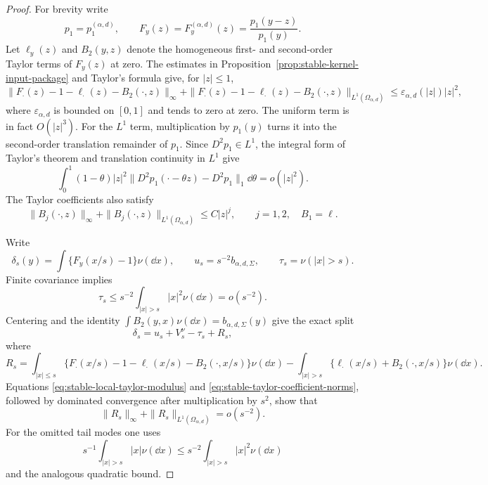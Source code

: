 \begin{proof}
For brevity write
\[
 p_1=p_1^{(\alpha,d)},\qquad
 F_y(z)=F_y^{(\alpha,d)}(z)
 =\frac{p_1(y-z)}{p_1(y)}.
\]
Let \(\ell_y(z)\) and \(B_2(y,z)\) denote the homogeneous first- and
second-order Taylor terms of \(F_y(z)\) at zero.  The estimates in
Proposition~\ref{prop:stable-kernel-input-package} and Taylor's formula give, for
\(|z|\le1\),
\begin{equation}\label{eq:stable-local-taylor-modulus}
 \|F_\cdot(z)-1-\ell_\cdot(z)-B_2(\cdot,z)\|_\infty
 +\|F_\cdot(z)-1-\ell_\cdot(z)-B_2(\cdot,z)\|_{L^1(\Omega_{\alpha,d})}
 \le\varepsilon_{\alpha,d}(|z|)|z|^2,
\end{equation}
where \(\varepsilon_{\alpha,d}\) is bounded on \([0,1]\) and tends to zero
at zero.  The uniform term is in fact \(O(|z|^3)\).  For the \(L^1\)
term, multiplication by \(p_1(y)\) turns it into the second-order
translation remainder of \(p_1\).  Since \(D^2p_1\in L^1\), the integral
form of Taylor's theorem and translation continuity in \(L^1\) give
\[
 \int_0^1(1-\theta)|z|^2
 \|D^2p_1(\mathord\cdot-\theta z)-D^2p_1\|_1\dd\theta=o(|z|^2).
\]
The Taylor coefficients also satisfy
\begin{equation}\label{eq:stable-taylor-coefficient-norms}
 \|B_j(\cdot,z)\|_\infty
 +\|B_j(\cdot,z)\|_{L^1(\Omega_{\alpha,d})}
 \le C|z|^j,\qquad j=1,2,\quad B_1=\ell.
\end{equation}

Write
\[
 \delta_s(y)=\int\{F_y(x/s)-1\}\nu(\dd x),\qquad
 u_s=s^{-2}b_{\alpha,d,\Sigma},\qquad
 \tau_s=\nu(|x|>s).
\]
Finite covariance implies
\begin{equation}\label{eq:stable-tail-mass-smallness}
 \tau_s\le s^{-2}\int_{|x|>s}|x|^2\nu(\dd x)=o(s^{-2}).
\end{equation}
Centering and the identity
\(\int B_2(y,x)\nu(\dd x)=b_{\alpha,d,\Sigma}(y)\) give the exact split
\begin{equation}\label{eq:stable-raw-tail-split}
 \delta_s=u_s+V_s^\nu-\tau_s+R_s,
\end{equation}
where
\[
 R_s=\int_{|x|\le s}\!
 \{F_\cdot(x/s)-1-\ell_\cdot(x/s)-B_2(\cdot,x/s)\}\nu(\dd x)
 -\int_{|x|>s}\!\{\ell_\cdot(x/s)+B_2(\cdot,x/s)\}\nu(\dd x).
\]
Equations \eqref{eq:stable-local-taylor-modulus} and
\eqref{eq:stable-taylor-coefficient-norms}, followed by dominated
convergence after multiplication by \(s^2\), show that
\begin{equation}\label{eq:stable-raw-tail-remainder-smallness}
 \|R_s\|_\infty+\|R_s\|_{L^1(\Omega_{\alpha,d})}=o(s^{-2}).
\end{equation}
For the omitted tail modes one uses
\[
 s^{-1}\int_{|x|>s}|x|\nu(\dd x)
 \le s^{-2}\int_{|x|>s}|x|^2\nu(\dd x)
\]
and the analogous quadratic bound.


\end{proof}
